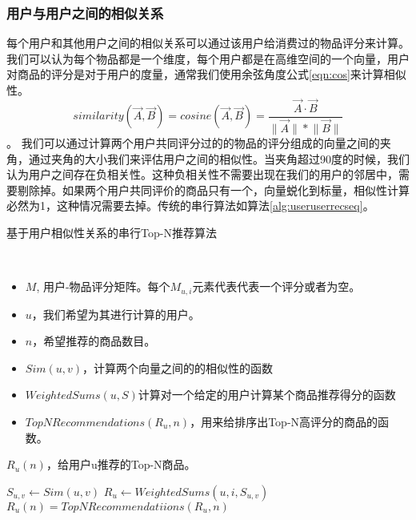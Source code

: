 \subsubsection{用户与用户之间的相似关系}
每个用户和其他用户之间的相似关系可以通过该用户给消费过的物品评分来计算。我们可以认为每个物品都是一个维度，每个用户都是在高维空间的一个向量，用户对商品的评分是对于用户的度量，通常我们使用余弦角度公式\ref{eqn:cos}来计算相似性。
    \begin{equation}\label{eqn:cos}
       similarity(\vec{A}, \vec{B}) = cosine(\vec{A}, \vec{B}) = \frac{\vec{A} \cdot \vec{B}}{\lVert\vec{A}\rVert\ast\lVert\vec{B}\rVert}
    \end{equation}。
    我们可以通过计算两个用户共同评分过的的物品的评分组成的向量之间的夹角，通过夹角的大小我们来评估用户之间的相似性。当夹角超过90度的时候，我们认为用户之间存在负相关性。这种负相关性不需要出现在我们的用户的邻居中，需要剔除掉。如果两个用户共同评价的商品只有一个，向量蜕化到标量，相似性计算必然为1，这种情况需要去掉。传统的串行算法如算法\ref{alg:useruserrecseq}。

 \begin{algorithm}
        \caption{基于用户相似性关系的串行Top-N推荐算法}\label{alg:useruserrecseq}
        \begin{algorithmic}[1] %
            \Require \\
            \begin{itemize}
                \item $M$, 用户-物品评分矩阵。每个$M_{u,i}$元素代表代表一个评分或者为空。
                \item $u$，我们希望为其进行计算的用户。
                \item $n$，希望推荐的商品数目。
                \item $Sim(u, v)$，计算两个向量之间的的相似性的函数
                \item $WeightedSums(u, S)$计算对一个给定的用户计算某个商品推荐得分的函数
                \item $TopNRecommendations(R_u, n)$，用来给排序出Top-N高评分的商品的函数。
            \end{itemize}
            \Ensure $R_u(n)$，给用户u推荐的Top-N商品。

        
                    \State $S_{u, v} \leftarrow Sim(u, v)$
                \EndIf
                        \State $R_u \leftarrow WeightedSums(u, i, S_{u, v})$
                    \EndIf
                \EndFor
            \EndFor 
            \State $R_u(n) = TopNRecommendatiions(R_u, n)$
        \end{algorithmic}
    \end{algorithm}

